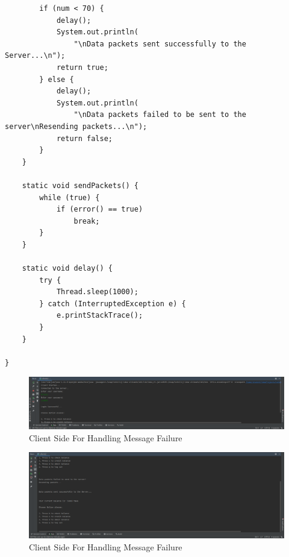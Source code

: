 \documentclass[11pt]{article}
\begin{document}
\begin{verbatim}
        if (num < 70) {
            delay();
            System.out.println(
                "\nData packets sent successfully to the Server...\n");
            return true;
        } else {
            delay();
            System.out.println(
                "\nData packets failed to be sent to the server\nResending packets...\n");
            return false;
        }
    }

    static void sendPackets() {
        while (true) {
            if (error() == true)
                break;
        }
    }

    static void delay() {
        try {
            Thread.sleep(1000);
        } catch (InterruptedException e) {
            e.printStackTrace();
        }
    }

}

\end{verbatim}
\newpage
\begin{figure}[!h]
\centering
\includegraphics[width=\textwidth]{message1.png}
\caption{Client Side For Handling Message Failure}
\end{figure}
\begin{figure}[!h]
\centering
\includegraphics[width=\textwidth]{message2.png}
\caption{Client Side For Handling Message Failure}
\end{figure}
\end{document}
